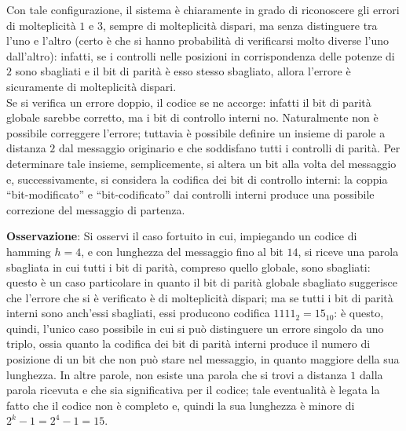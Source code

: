 \documentclass[a4paper]{extarticle}
\newcommand{\quotes}[1]{``#1''}
\begin{document}
\vspace{1em}
\noindent
Con tale configurazione, il sistema è chiaramente in grado di riconoscere gli errori di molteplicità $1$ e $3$, sempre di molteplicità dispari, ma senza distinguere tra l'uno e l'altro (certo è che si hanno probabilità di verificarsi molto diverse l'uno dall'altro): infatti, se i controlli nelle posizioni in corrispondenza delle potenze di $2$ sono sbagliati e il bit di parità è esso stesso sbagliato, allora l'errore è sicuramente di molteplicità dispari.\\
Se si verifica un errore doppio, il codice se ne accorge: infatti il bit di parità globale sarebbe corretto, ma i bit di controllo interni no. Naturalmente non è possibile correggere l'errore; tuttavia è possibile definire un insieme di parole a distanza $2$ dal messaggio originario e che soddisfano tutti i controlli di parità. Per determinare tale insieme, semplicemente, si altera un bit alla volta del messaggio e, successivamente, si considera la codifica dei bit di controllo interni: la coppia \quotes{bit-modificato} e \quotes{bit-codificato} dai controlli interni produce una possibile correzione del messaggio di partenza.

\vspace{1em}
\noindent
\textbf{Osservazione}: Si osservi il caso fortuito in cui, impiegando un codice di hamming $h=4$, e con lunghezza del messaggio fino al bit $14$, si riceve una parola sbagliata in cui tutti i bit di parità, compreso quello globale, sono sbagliati: questo è un caso particolare in quanto il bit di parità globale sbagliato suggerisce che l'errore che si è verificato è di molteplicità dispari; ma se tutti i bit di parità interni sono anch'essi sbagliati, essi producono codifica $1111_2=15_{10}$: è questo, quindi, l'unico caso possibile in cui si può distinguere un errore singolo da uno triplo, ossia quanto la codifica dei bit di parità interni produce il numero di posizione di un bit che non può stare nel messaggio, in quanto maggiore della sua lunghezza. In altre parole, non esiste una parola che si trovi a distanza $1$ dalla parola ricevuta e che sia significativa per il codice; tale eventualità è legata la fatto che il codice non è completo e, quindi la sua lunghezza è minore di $2^k-1=2^4-1=15$.

\vspace{1em}
\end{document}
